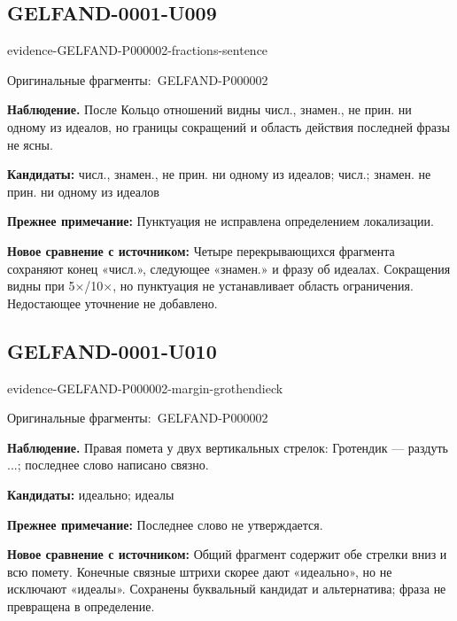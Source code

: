 \documentclass[11pt]{article}
\newcommand{\EvidenceBlock}[4]{%
 \par\smallskip\noindent\begin{minipage}{\linewidth}
 \begin{minipage}[t]{.47\linewidth}\vspace{0pt}\centering
 \csname evidence-#1-#2\endcsname\par
 {\scriptsize\SourceCropCaption\ #1}\par
 \end{minipage}\hfill
 \begin{minipage}[t]{.49\linewidth}\vspace{0pt}\raggedright
 {\small\color{orange!65!black}\textbf{#4} #3}\par
 \end{minipage}
 \end{minipage}\par\smallskip}
\newcommand{\SourceCropCaption}{Оригинальные фрагменты:}\newcommand{\ReadingCaption}{Сомнительное чтение.}\newcommand{\IncompleteCaption}{Неразобранный фрагмент.}\newcommand{\DiagramCaption}{Рисунок и набранное описание.}
\begin{document}
\subsection*{GELFAND-0001-U009}
\EvidenceBlock{GELFAND-P000002}{fractions-sentence}{После Кольцо отношений видны числ., знамен., не прин. ни одному из идеалов, но границы сокращений и область действия последней фразы не ясны.}{Наблюдение.}
\par\smallskip\noindent\textbf{Кандидаты: } числ., знамен., не прин. ни одному из идеалов; числ.; знамен. не прин. ни одному из идеалов\par
\par\smallskip\noindent\textbf{Прежнее примечание: } Пунктуация не исправлена определением локализации.\par
\par\smallskip\noindent\textbf{Новое сравнение с источником: } Четыре перекрывающихся фрагмента сохраняют конец «числ.», следующее «знамен.» и фразу об идеалах. Сокращения видны при 5×/10×, но пунктуация не устанавливает область ограничения. Недостающее уточнение не добавлено.\par

\subsection*{GELFAND-0001-U010}
\EvidenceBlock{GELFAND-P000002}{margin-grothendieck}{Правая помета у двух вертикальных стрелок: Гротендик — раздуть ...; последнее слово написано связно.}{Наблюдение.}
\par\smallskip\noindent\textbf{Кандидаты: } идеально; идеалы\par
\par\smallskip\noindent\textbf{Прежнее примечание: } Последнее слово не утверждается.\par
\par\smallskip\noindent\textbf{Новое сравнение с источником: } Общий фрагмент содержит обе стрелки вниз и всю помету. Конечные связные штрихи скорее дают «идеально», но не исключают «идеалы». Сохранены буквальный кандидат и альтернатива; фраза не превращена в определение.\par
\end{document}
